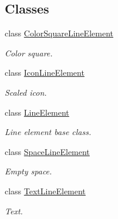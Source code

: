 \subsection*{Classes}
\begin{DoxyCompactItemize}
\item 
class \mbox{\hyperlink{classScreen_1_1ColorSquareLineElement}{Color\+Square\+Line\+Element}}
\begin{DoxyCompactList}\small\item\em Color square. \end{DoxyCompactList}\item 
class \mbox{\hyperlink{classScreen_1_1IconLineElement}{Icon\+Line\+Element}}
\begin{DoxyCompactList}\small\item\em Scaled icon. \end{DoxyCompactList}\item 
class \mbox{\hyperlink{classScreen_1_1LineElement}{Line\+Element}}
\begin{DoxyCompactList}\small\item\em Line element base class. \end{DoxyCompactList}\item 
class \mbox{\hyperlink{classScreen_1_1SpaceLineElement}{Space\+Line\+Element}}
\begin{DoxyCompactList}\small\item\em Empty space. \end{DoxyCompactList}\item 
class \mbox{\hyperlink{classScreen_1_1TextLineElement}{Text\+Line\+Element}}
\begin{DoxyCompactList}\small\item\em Text. \end{DoxyCompactList}\end{DoxyCompactItemize}
